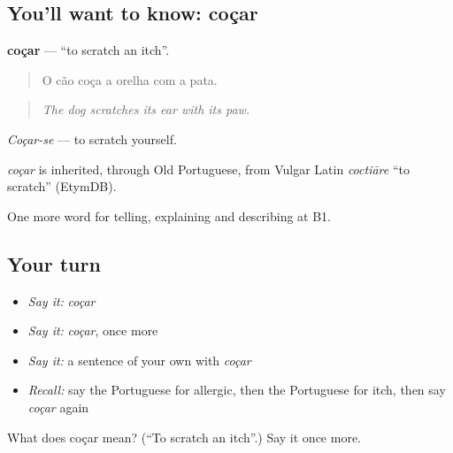 \subsection*{You'll want to know: coçar}
\textbf{coçar} — \textquotedblleft{}to scratch an itch\textquotedblright{}.

\begin{quote}
O cão coça a orelha com a pata.
\end{quote}

\begin{quote}
\emph{The dog scratches its ear with its paw.}
\end{quote}

\emph{Coçar-se} — to scratch yourself.

\begin{cousinweb}
\emph{coçar} is inherited, through Old Portuguese, from Vulgar Latin \emph{coctiāre} \textquotedblleft{}to scratch\textquotedblright{} (EtymDB).
\end{cousinweb}

\begin{grammarlens}[title={What you've built}]
One more word for telling, explaining and describing at B1.
\end{grammarlens}

\subsection*{Your turn}
\begin{itemize}
\raggedright
  \item \emph{Say it:} \emph{coçar}
  \item \emph{Say it:} \emph{coçar}, once more
  \item \emph{Say it:} a sentence of your own with \emph{coçar}
  \item \emph{Recall:} say the Portuguese for allergic, then the Portuguese for itch, then say \emph{coçar} again
\end{itemize}

\begin{tcolorbox}[breakable,colback=teal!4,colframe=teal!35!black,title={Before you move on}]
What does coçar mean? (\textquotedblleft{}To scratch an itch\textquotedblright{}.) Say it once more.
\end{tcolorbox}
